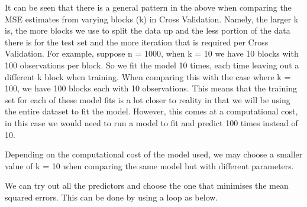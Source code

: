 \documentclass[11pt]{article}
\begin{document}
It can be seen that there is a general pattern in the above when
comparing the MSE estimates from varying blocks (k) in Cross Validation.
Namely, the larger k is, the more blocks we use to split the data up and
the less portion of the data there is for the test set and the more
iteration that is required per Cross Validation. For example, suppose n
= 1000, when k = 10 we have 10 blocks with 100 observations per block.
So we fit the model 10 times, each time leaving out a different k block
when training. When comparing this with the case where k = 100, we have
100 blocks each with 10 observations. This means that the training set
for each of these model fits is a lot closer to reality in that we will
be using the entire dataset to fit the model. However, this comes at a
computational cost, in this case we would need to run a model to fit and
predict 100 times instead of 10.

Depending on the computational cost of the model used, we may choose a
smaller value of k = 10 when comparing the same model but with different
parameters.

We can try out all the predictors and choose the one that minimises the
mean squared errors. This can be done by using a loop as below.
\end{document}

